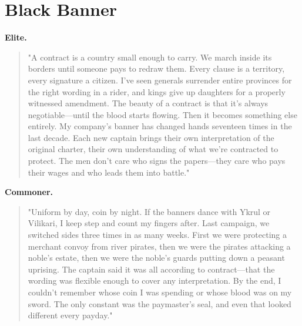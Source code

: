 \section*{Black Banner}
\textbf{Elite.}
\begin{quote}
"A contract is a country small enough to carry. We march inside its borders until someone pays to redraw them. Every clause is a territory, every signature a citizen. I've seen generals surrender entire provinces for the right wording in a rider, and kings give up daughters for a properly witnessed amendment. The beauty of a contract is that it's always negotiable—until the blood starts flowing. Then it becomes something else entirely. My company's banner has changed hands seventeen times in the last decade. Each new captain brings their own interpretation of the original charter, their own understanding of what we're contracted to protect. The men don't care who signs the papers—they care who pays their wages and who leads them into battle."
\end{quote}
\textbf{Commoner.}
\begin{quote}
"Uniform by day, coin by night. If the banners dance with Ykrul or Vilikari, I keep step and count my fingers after. Last campaign, we switched sides three times in as many weeks. First we were protecting a merchant convoy from river pirates, then we were the pirates attacking a noble's estate, then we were the noble's guards putting down a peasant uprising. The captain said it was all according to contract—that the wording was flexible enough to cover any interpretation. By the end, I couldn't remember whose coin I was spending or whose blood was on my sword. The only constant was the paymaster's seal, and even that looked different every payday."
\end{quote}

